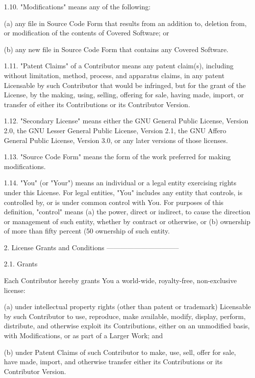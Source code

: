 1.10. "Modifications"
    means any of the following:

    (a) any file in Source Code Form that results from an addition to,
        deletion from, or modification of the contents of Covered
        Software; or

    (b) any new file in Source Code Form that contains any Covered
        Software.

1.11. "Patent Claims" of a Contributor
    means any patent claim(s), including without limitation, method,
    process, and apparatus claims, in any patent Licensable by such
    Contributor that would be infringed, but for the grant of the
    License, by the making, using, selling, offering for sale, having
    made, import, or transfer of either its Contributions or its
    Contributor Version.

1.12. "Secondary License"
    means either the GNU General Public License, Version 2.0, the GNU
    Lesser General Public License, Version 2.1, the GNU Affero General
    Public License, Version 3.0, or any later versions of those
    licenses.

1.13. "Source Code Form"
    means the form of the work preferred for making modifications.

1.14. "You" (or "Your")
    means an individual or a legal entity exercising rights under this
    License. For legal entities, "You" includes any entity that
    controls, is controlled by, or is under common control with You. For
    purposes of this definition, "control" means (a) the power, direct
    or indirect, to cause the direction or management of such entity,
    whether by contract or otherwise, or (b) ownership of more than
    fifty percent (50%
    ownership of such entity.

2. License Grants and Conditions
--------------------------------

2.1. Grants

Each Contributor hereby grants You a world-wide, royalty-free,
non-exclusive license:

(a) under intellectual property rights (other than patent or trademark)
    Licensable by such Contributor to use, reproduce, make available,
    modify, display, perform, distribute, and otherwise exploit its
    Contributions, either on an unmodified basis, with Modifications, or
    as part of a Larger Work; and

(b) under Patent Claims of such Contributor to make, use, sell, offer
    for sale, have made, import, and otherwise transfer either its
    Contributions or its Contributor Version.

